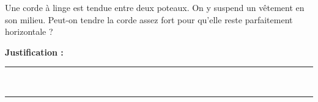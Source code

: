 Une corde à linge est tendue entre deux poteaux. On y suspend un vêtement en son milieu. Peut-on tendre la corde assez fort pour qu'elle reste parfaitement horizontale ?

\choices

\noindent\textbf{Justification :} \hrulefill \\[2.5ex]
\rule{\linewidth}{0.4pt} \\[2.5ex]
\rule{\linewidth}{0.4pt}
\vfill
